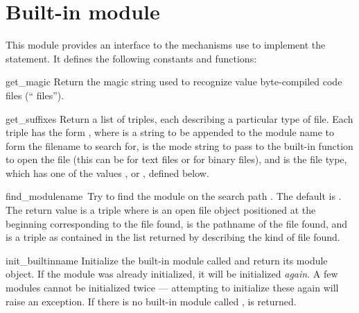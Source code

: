 \section{Built-in module }

This module provides an interface to the mechanisms use to implement
the  statement.  It defines the following constants and
functions:

\renewcommand{\indexsubitem}{(in module struct)}

\begin{funcdesc}{get_magic}{}
Return the magic string used to recognize value byte-compiled code
files (`` files'').
\end{funcdesc}

\begin{funcdesc}{get_suffixes}{}
Return a list of triples, each describing a particular type of file.
Each triple has the form , where  is a string to be appended to the
module name to form the filename to search for,  is the mode
string to pass to the built-in  function to open the file
(this can be  for text files or  for binary
files), and  is the file type, which has one of the values
,  or , defined
below.
\end{funcdesc}

\begin{funcdesc}{find_module}{name\, }
Try to find the module  on the search path .  The
default  is .  The return value is a triple
 where
 is an open file object positioned at the beginning
corresponding to the file found,  is the pathname of the
file found, and  is a triple as contained in the list
returned by  describing the kind of file found.
\end{funcdesc}

\begin{funcdesc}{init_builtin}{name}
Initialize the built-in module called  and return its module
object.  If the module was already initialized, it will be initialized
{\em again}.  A few modules cannot be initialized twice --- attempting
to initialize these again will raise an exception.  If there is no
built-in module called ,  is returned.
\end{funcdesc}

